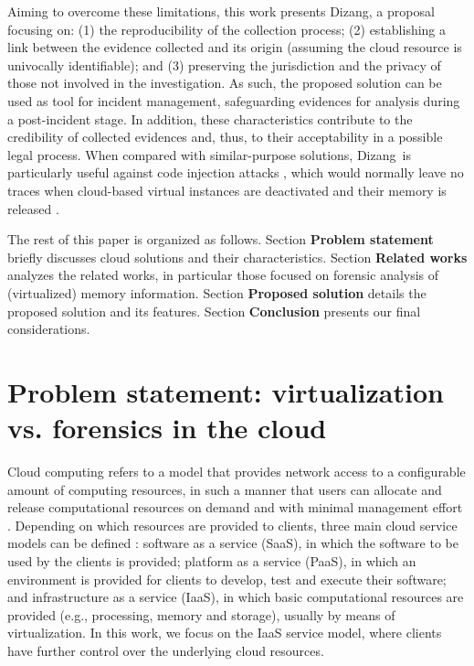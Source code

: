 \documentclass[twocolumn, notitlepage]{bmcart}%
\newcommand{\fancyname}{Dizang}
\begin{document}
%
Aiming to overcome these limitations, this work presents \fancyname, a proposal focusing on: (1) the reproducibility of the collection process; (2) establishing a link between the evidence collected and its origin (assuming the cloud resource is univocally identifiable); and (3) preserving the jurisdiction and the privacy of those not involved in the investigation.
%
As such, the proposed solution can be used as tool for incident management, safeguarding evidences for analysis during a post-incident stage.
%
In addition, these characteristics contribute to the credibility of collected evidences and, thus, to their acceptability in a possible legal process.
%
When compared with similar-purpose solutions, \fancyname\ is particularly useful against code injection attacks \cite{Case_Memory_Forensics:2014}, which would normally leave no traces when cloud-based virtual instances are deactivated and their memory is released \cite{Vomel_Memory_Acquisition:2013,Case_Memory_Forensics:2014}.


The rest of this paper is organized as follows.
%
Section \textbf{Problem statement} briefly discusses cloud solutions and their characteristics.
%
Section \textbf{Related works} analyzes the related works, in particular those focused on forensic analysis of (virtualized) memory information.
%
Section \textbf{Proposed solution} details the proposed solution and its features.
%
Section \textbf{Conclusion} presents our final considerations.



\section*{Problem statement: virtualization vs. forensics in the cloud}
\label{sec:cloud}

Cloud computing refers to a model that provides network access to a configurable amount of computing resources, in such a manner that users can allocate and release computational resources on demand and with minimal management effort \cite{NIST2011}.
%
Depending on which resources are provided to clients, three main cloud service models can be defined \cite{NIST2011}: software as a service (SaaS), in which the software to be used by the clients is provided; platform as a service (PaaS), in which an environment is provided for clients to develop, test and execute their software; and infrastructure as a service (IaaS), in which basic computational resources are provided (e.g., processing, memory and storage), usually by means of virtualization.
%
In this work, we focus on the IaaS service model, where clients have further control over the underlying cloud resources.
\end{document}
